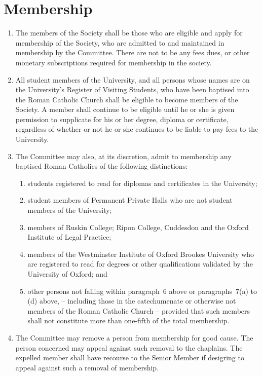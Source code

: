 \documentclass[11pt]{article}
\begin{document}
\section{Membership}
\begin{enumerate}
\item The members of the Society shall be those who are eligible and apply for membership of the Society, who are admitted to and maintained in membership by the Committee.  There are not to be any fees dues, or other monetary subscriptions required for membership in the society.
\item All student members of the University, and all persons whose names are on the University's Register of Visiting Students, who have been baptised into the Roman Catholic Church shall be eligible to become members of the Society. A member shall continue to be eligible until he or she is given permission to supplicate for his or her degree, diploma or certificate, regardless of whether or not he or she continues to be liable to pay fees to the University.
\item The Committee may also, at its discretion, admit to membership any baptised Roman Catholics of the following distinctions:-
\begin{enumerate}
\item students registered to read for diplomas and certificates in the University;
\item student members of Permanent Private Halls who are not student members of the University;
\item members of Ruskin College; Ripon College, Cuddesdon and the Oxford Institute of Legal Practice; 
\item members of the Westminster Institute of Oxford Brookes University who are registered to read for degrees or other qualifications validated by the University of Oxford; and
\item other persons not falling within paragraph~6 above or paragraphs~7(a) to (d) above,  -- including those in the catechumenate or otherwise not members of the Roman Catholic Church -- provided that such members shall not constitute more than one-fifth of the total membership.
\end{enumerate}
\item The Committee may remove a person from membership for good cause. The person concerned may appeal against such removal to the chaplains.  The expelled member shall have recourse to the Senior Member if desigring to appeal against such a removal of membership.
\end{enumerate}
\end{document}
